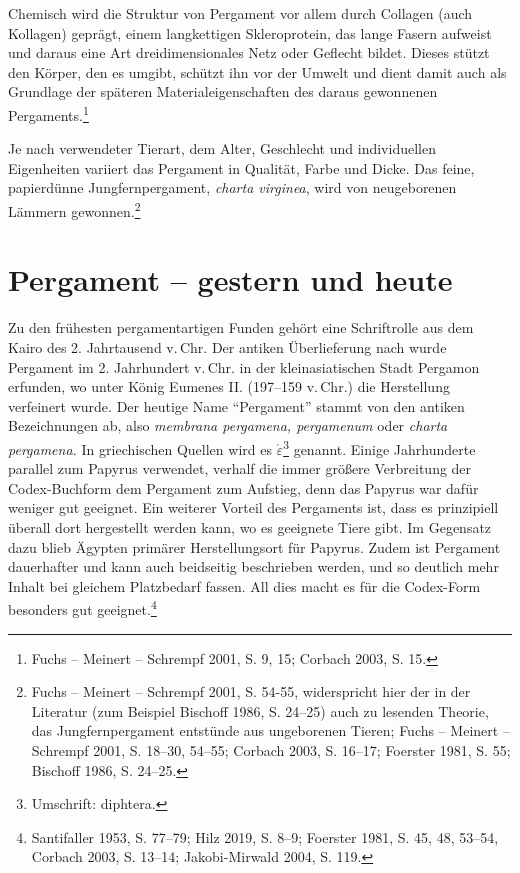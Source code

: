 \documentclass[a4paper,
fontsize=11pt,
oneside,
numbers=noperiodatend,
parskip=half-,
bibliography=totoc,
final
]{scrartcl}
\begin{document}
Chemisch wird die Struktur von Pergament vor allem durch Collagen (auch
Kollagen) geprägt, einem langkettigen Skleroprotein, das lange Fasern
aufweist und daraus eine Art dreidimensionales Netz oder Geflecht
bildet. Dieses stützt den Körper, den es umgibt, schützt ihn vor der
Umwelt und dient damit auch als Grundlage der späteren
Materialeigenschaften des daraus gewonnenen Pergaments.\footnote{Fuchs
  -- Meinert -- Schrempf 2001, S. 9, 15; Corbach 2003, S. 15.}

Je nach verwendeter Tierart, dem Alter, Geschlecht und individuellen
Eigenheiten variiert das Pergament in Qualität, Farbe und Dicke. Das
feine, papierdünne Jungfernpergament, \emph{charta virginea}, wird von
neugeborenen Lämmern gewonnen.\footnote{Fuchs -- Meinert -- Schrempf
  2001, S. 54-55, widerspricht hier der in der Literatur (zum Beispiel
  Bischoff 1986, S. 24--25) auch zu lesenden Theorie, das
  Jungfernpergament entstünde aus ungeborenen Tieren; Fuchs -- Meinert
  -- Schrempf 2001, S. 18--30, 54--55; Corbach 2003, S. 16--17; Foerster
  1981, S. 55; Bischoff 1986, S. 24--25.}

\hypertarget{pergament-gestern-und-heute}{%
\section{Pergament -- gestern und
heute}\label{pergament-gestern-und-heute}}

Zu den frühesten pergamentartigen Funden gehört eine Schriftrolle aus
dem Kairo des 2. Jahrtausend v.\,Chr. Der antiken Überlieferung nach
wurde Pergament im 2. Jahrhundert v.\,Chr. in der kleinasiatischen Stadt
Pergamon erfunden, wo unter König Eumenes II. (197--159 v.\,Chr.) die
Herstellung verfeinert wurde. Der heutige Name \enquote{Pergament}
stammt von den antiken Bezeichnungen ab, also \emph{membrana pergamena,
pergamenum} oder \emph{charta pergamena.} In griechischen Quellen wird
es \textdelta\textiota\textphi\texttau$\acute{\varepsilon}$\textrho\textalpha\footnote{Umschrift: diphtera.} genannt. Einige Jahrhunderte
parallel zum Papyrus verwendet, verhalf die immer größere Verbreitung
der Codex-Buchform dem Pergament zum Aufstieg, denn das Papyrus war
dafür weniger gut geeignet. Ein weiterer Vorteil des Pergaments ist,
dass es prinzipiell überall dort hergestellt werden kann, wo es
geeignete Tiere gibt. Im Gegensatz dazu blieb Ägypten primärer
Herstellungsort für Papyrus. Zudem ist Pergament dauerhafter und kann
auch beidseitig beschrieben werden, und so deutlich mehr Inhalt bei
gleichem Platzbedarf fassen. All dies macht es für die Codex-Form
besonders gut geeignet.\footnote{Santifaller 1953, S. 77--79; Hilz 2019,
  S. 8--9; Foerster 1981, S. 45, 48, 53--54, Corbach 2003, S. 13--14;
  Jakobi-Mirwald 2004, S. 119.}
\end{document}
